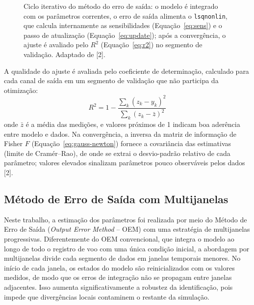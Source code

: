 \documentclass[letterpaper, 10 pt, conference]{ieeeconf}
\begin{document}
\begin{figure}[htbp]
\caption{Ciclo iterativo do m\'etodo do erro de sa\'ida: o modelo \'e integrado com os par\^ametros correntes, o erro de sa\'ida alimenta o \texttt{lsqnonlin}, que calcula internamente as sensibilidades (Equa\c{c}\~ao~\eqref{eq:sens}) e o passo de atualiza\c{c}\~ao (Equa\c{c}\~ao~\eqref{eq:update}); ap\'os a converg\^encia, o ajuste \'e avaliado pelo $R^2$ (Equa\c{c}\~ao~\eqref{eq:r2}) no segmento de valida\c{c}\~ao. Adaptado de [2].}
\label{fig:opt_loop}
\end{figure}

A qualidade do ajuste é avaliada pelo coeficiente de determinação, calculado para cada canal de saída em um segmento de validação que não participa da otimização:
\begin{equation}
R^2 = 1 - \frac{\sum_{k}(z_k - y_k)^2}{\sum_{k}(z_k - \bar{z})^2}
\label{eq:r2}
\end{equation}
onde $\bar{z}$ é a média das medições, e valores próximos de 1 indicam boa aderência entre modelo e dados. Na convergência, a inversa da matriz de informação de Fisher $F$ (Equação~\eqref{eq:gauss-newton}) fornece a covariância das estimativas (limite de Cramér--Rao), de onde se extrai o desvio-padrão relativo de cada parâmetro; valores elevados sinalizam parâmetros pouco observáveis pelos dados [2].

\subsection{Método de Erro de Saída com Multijanelas}

Neste trabalho, a estimação dos parâmetros foi realizada por meio do Método de Erro de Saída (\textit{Output Error Method} -- OEM) com uma estratégia de multijanelas progressivas. Diferentemente do OEM convencional, que integra o modelo ao longo de todo o registro de voo com uma única condição inicial, a abordagem por multijanelas divide cada segmento de dados em janelas temporais menores. No início de cada janela, os estados do modelo são reinicializados com os valores medidos, de modo que os erros de integração não se propagam entre janelas adjacentes. Isso aumenta significativamente a robustez da identificação, pois impede que divergências locais contaminem o restante da simulação.
\end{document}
